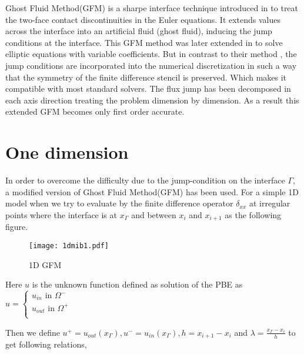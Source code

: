 Ghost Fluid Method(GFM) is a sharpe interface technique introduced in  \cite{Fedkiw1999} to treat the two-face contact discontinuities in the Euler equations. It extends values across the interface into an artificial fluid (ghost fluid), inducing the jump conditions at the interface. This GFM method was later extended in \cite{Liu2000} to solve elliptic equations with variable coefficients. But in contrast to their method \cite{Liu2000} , the jump conditions are incorporated into the numerical discretization in such a way that the symmetry of the finite difference stencil is preserved. Which makes it compatible with most standard solvers. The flux jump has been decomposed in each axis direction treating the problem dimension by dimension. As a result this extended GFM becomes only first order accurate.   


\section{One dimension}

In order to overcome the difficulty due to the jump-condition on the interface $\Gamma$, a modified version of Ghost Fluid Method(GFM) has been used. For a simple 1D model when we try to evaluate by the finite difference operator $\delta_{xx}$ at irregular points where the interface is at $x_\Gamma$ and between $x_i$ and $x_{i+1}$ as the following figure.  %

\begin{figure}[ht]
\begin{center}
\texttt{[image: 1dmib1.pdf]}\hspace{10mm}

\caption{1D GFM}
\label{fig_1}
\end{center}
\end{figure}


Here $u$ is the unknown function defined as solution of the PBE as $u=\begin{cases}
u_{in} \text{ in }\Omega^-\\
u_{out}\text{ in }\Omega^+\\
\end{cases}$

Then we define $u^+ = u_{out}(x_\Gamma),u^- = u_{in}(x_\Gamma),h=x_{i+1}-x_i$ and  $\lambda =\frac{x_\Gamma-x_i}{h}$ to get following relations,
 
